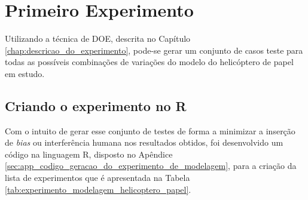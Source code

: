 \chapter{Primeiro Experimento}
\label{chap:primeiro_experimento}


Utilizando a técnica de \ac{DOE}, descrita no Capítulo \ref{chap:descricao_do_experimento}, pode-se gerar um conjunto de casos teste para todas as possíveis combinações de variações do modelo do helicóptero de papel em estudo.

\section{Criando o experimento no R}
\label{sec:primeiro_experimento_criando o experimento_no_R}


Com o intuito de gerar esse conjunto de testes de forma a minimizar a inserção de \textit{bias} ou interferência humana nos resultados obtidos, foi desenvolvido um código na linguagem R, disposto no Apêndice \ref{sec:app_codigo_geracao_do_experimento_de_modelagem}, para a criação da lista de experimentos que é apresentada na Tabela \ref{tab:experimento_modelagem_helicoptero_papel}.

